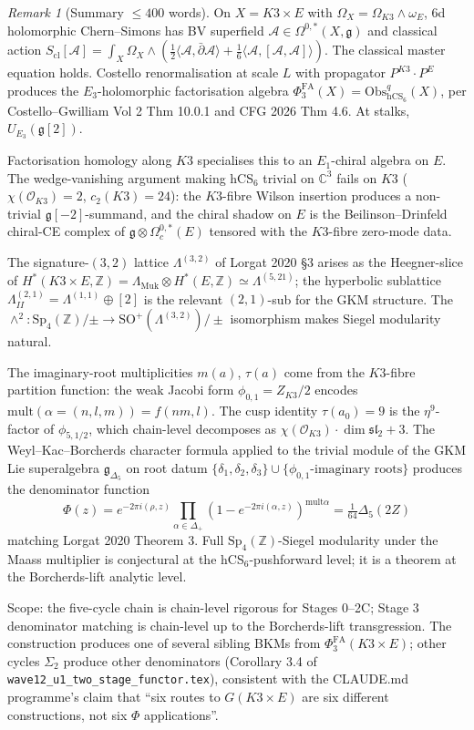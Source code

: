 \documentclass[11pt]{amsart}
\providecommand{\C}{\mathbb{C}}
\providecommand{\Z}{\mathbb{Z}}
\providecommand{\cO}{\mathcal{O}}
\providecommand{\cA}{\mathcal{A}}
\providecommand{\dbar}{\bar{\partial}}
\providecommand{\g}{\mathfrak{g}}
\providecommand{\fsl}{\mathfrak{sl}}
\providecommand{\Obs}{\mathrm{Obs}}
\providecommand{\hCS}{\mathrm{hCS}}
\providecommand{\Muk}{\Lambda_{\mathrm{Muk}}}
\providecommand{\HB}{\Lambda^{(2,1)}_{I\!I}}
\providecommand{\LamF}{\Lambda^{(3,2)}}
\providecommand{\Gdelta}{\mathfrak{g}_{\Delta_{5}}}
\providecommand{\PhiFA}{\Phi^{\mathrm{FA}}}
\theoremstyle{plain}
\theoremstyle{definition}
\theoremstyle{remark}
\newtheorem{remark}[theorem]{Remark}
\begin{document}
\begin{remark}[Summary $\leq 400$ words]\label{rem:400-word}
On $X = K3\times E$ with $\Omega_{X} = \Omega_{K3}\wedge\omega_{E}$,
$6$d holomorphic Chern--Simons has BV superfield $\cA\in
\Omega^{0,\ast}(X,\g)$ and classical action $S_{\mathrm{cl}}[\cA] =
\int_{X}\Omega_{X}\wedge(\tfrac12\langle\cA,\dbar\cA\rangle + \tfrac16
\langle\cA,[\cA,\cA]\rangle)$. The classical master equation holds.
Costello renormalisation at scale $L$ with propagator $P^{K3}\cdot
P^{E}$ produces the $E_{3}$-holomorphic factorisation algebra
$\PhiFA_{3}(X) = \Obs^{q}_{\hCS_{6}}(X)$, per Costello--Gwilliam Vol 2
Thm 10.0.1 and CFG 2026 Thm 4.6. At stalks, $U_{E_{3}}(\g[2])$.

Factorisation homology along $K3$ specialises this to an
$E_{1}$-chiral algebra on $E$. The wedge-vanishing
argument making hCS$_{6}$ trivial on $\C^{3}$ fails on $K3$
($\chi(\cO_{K3}) = 2$, $c_{2}(K3)=24$): the $K3$-fibre Wilson insertion
produces a non-trivial $\g[-2]$-summand, and the chiral shadow on $E$
is the Beilinson--Drinfeld chiral-CE complex of $\g\otimes
\Omega^{0,\ast}_{c}(E)$ tensored with the $K3$-fibre zero-mode data.

The signature-$(3,2)$ lattice $\LamF$ of Lorgat 2020 \S3 arises as
the Heegner-slice of $H^{\ast}(K3 \times E, \Z) = \Muk \otimes
H^{\ast}(E, \Z) \simeq \Lambda^{(5,21)}$; the hyperbolic sublattice
$\HB = \Lambda^{(1,1)}\oplus[2]$ is the relevant $(2,1)$-sub for the
GKM structure. The $\wedge^{2}: \mathrm{Sp}_{4}(\Z)/\pm \to
\mathrm{SO}^{+}(\LamF)/\pm$ isomorphism makes Siegel modularity
natural.

The imaginary-root multiplicities $m(a)$, $\tau(a)$ come from the
$K3$-fibre partition function: the weak Jacobi form $\phi_{0,1} =
Z_{K3}/2$ encodes
$\mathrm{mult}(\alpha = (n,l,m))=f(nm,l)$. The cusp identity
$\tau(a_{0}) = 9$ is the $\eta^{9}$-factor of $\phi_{5,1/2}$, which
chain-level decomposes as $\chi(\cO_{K3}) \cdot \dim\fsl_{2} + 3$.
The Weyl--Kac--Borcherds character formula applied to the trivial
module of the GKM Lie superalgebra $\Gdelta$ on root datum
$\{\delta_{1},\delta_{2},\delta_{3}\}\cup\{\phi_{0,1}
\text{-imaginary roots}\}$ produces the denominator function
\[
\Phi(z) = e^{-2\pi i(\rho,z)}\prod_{\alpha\in\Delta_{+}}
(1-e^{-2\pi i(\alpha,z)})^{\mathrm{mult}\alpha} = \tfrac{1}{64}
\Delta_{5}(2Z)
\]
matching Lorgat 2020 Theorem 3. Full $\mathrm{Sp}_{4}(\Z)$-Siegel
modularity under the Maass multiplier is conjectural at the
hCS$_{6}$-pushforward level; it is a theorem at the Borcherds-lift
analytic level.

Scope: the five-cycle chain is chain-level rigorous for Stages 0--2C;
Stage 3 denominator matching is chain-level up to the Borcherds-lift
transgression. The construction produces one of several sibling BKMs
from $\PhiFA_{3}(K3\times E)$; other cycles $\Sigma_{2}$ produce other
denominators (Corollary 3.4 of \texttt{wave12\_u1\_two\_stage\_functor.tex}),
consistent with the CLAUDE.md programme's claim that ``six routes to
$G(K3\times E)$ are six different constructions, not six $\Phi$
applications''.
\end{remark}
\end{document}

